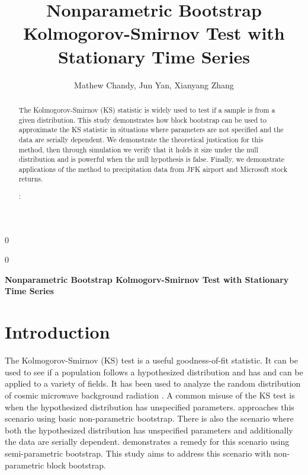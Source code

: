 \documentclass[12pt, letterpaper]{article}
\newcommand{\blind}{0}
\begin{document}

\blind
{
  \title{\bf Nonparametric Bootstrap Kolmogorov-Smirnov Test with Stationary 
  Time Series}
  \author{Mathew Chandy, %
  Jun Yan, %
  Xianyang Zhang\\
}
\date{}
  \maketitle
} \fi

\blind
{
  \bigskip
  \bigskip
  \bigskip
  \begin{center}
    {\LARGE\bf Nonparametric Bootstrap Kolmogorv-Smirnov Test with Stationary 
    Time Series}
\end{center}
  \bigskip
} \fi


\doublespace

\begin{abstract}

The Kolmogorov-Smirnov (KS) statistic is widely used to test if a sample is
from a given distribution. This study demonstrates how block bootstrap can be 
used to approximate the KS statistic in situations where parameters are 
not specified and the data are serially dependent. We demonstrate the 
theoretical justication for this method, then through simulation we verify that
it holds it size under the null distribution and is powerful when the null 
hypothesis is false. Finally, we demonstrate applications of the method to
precipitation data from JFK airport and Microsoft stock returns.

\bigskip
{}:
\end{abstract}



\section{Introduction}
\label{sec:intro}

The Kolmogorov-Smirnov (KS) test is a useful goodness-of-fit statistic. It 
can be used to see if a population follows a hypothesized distribution and has 
and can be applied to a variety of fields. It has
been used to analyze the random distribution of cosmic microwave background 
radiation \citep{naess2012application}. A common misuse of the KS test is when
the hypothesized distribution has unspecified parameters. 
\citet{babu2004goodness} approaches this scenario using basic 
non-parametric bootstrap. There is also the scenario where both the hypothesized 
distribution has unspecified parameters and additionally the data are 
serially dependent. \citet{zeimbekakis2022misuses} demonstrates a remedy for
this scenario using semi-parametric bootstrap. This study aims to address this
scenario with non-parametric block bootstrap.
\end{document}
